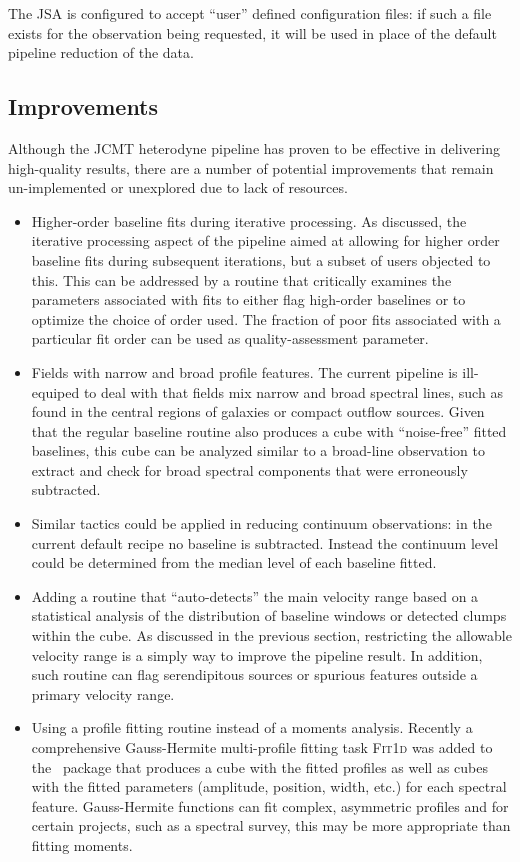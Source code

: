 \documentclass[final,authoryear,5p,times,twocolumn]{elsarticle}
\begin{document}
The JSA is configured to accept ``user'' defined configuration files: if such
a file exists for the observation being requested, it will be used in place of the default
pipeline reduction of the data.

\subsection{Improvements}

Although the JCMT heterodyne pipeline has proven to be effective in delivering
high-quality results, there are a number of potential improvements that remain
un-implemented or unexplored due to lack of resources.

\begin{itemize}
\item  Higher-order baseline fits during iterative processing. As discussed, the
iterative processing aspect of the pipeline aimed at allowing for higher order
baseline fits during subsequent iterations, but a subset of users objected
to this. This can be addressed by a routine that critically examines the
parameters associated with fits to either flag high-order baselines
or to optimize the choice of order used. The fraction of poor fits associated
with a particular fit order can be used as quality-assessment parameter.
\item Fields with narrow and broad profile features.  The current pipeline
is ill-equiped to deal with that fields mix narrow and broad spectral
lines, such as found in the central regions of galaxies or compact
outflow sources. Given that the regular baseline routine also produces a
cube with ``noise-free'' fitted baselines, this cube can be analyzed similar to a
broad-line observation to extract and check for broad
spectral components that were erroneously subtracted.
\item Similar tactics could be applied in reducing continuum observations:
in the current default recipe no baseline is subtracted. Instead the continuum
level could be determined from the median level of each baseline fitted.
\item Adding a routine that ``auto-detects'' the main velocity range based
on a statistical analysis of the distribution of baseline windows or detected clumps
within the cube. As discussed in the previous section, restricting the allowable
velocity range is a simply way to improve the pipeline result. In addition,
such routine can flag serendipitous sources or spurious features outside
a primary velocity range.
\item Using a profile fitting routine instead of a moments analysis. Recently a
comprehensive Gauss-Hermite multi-profile fitting task \textsc{Fit{\footnotesize{1}}d}
was added to the \smurf\ package that produces a cube with the fitted profiles as well
as cubes with the fitted parameters (amplitude, position, width, etc.) for
each spectral feature. Gauss-Hermite functions can fit complex, asymmetric
profiles and for certain projects, such as a spectral survey, this may be more
appropriate than fitting moments.
\end{itemize}
\end{document}
